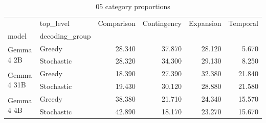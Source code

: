 \begin{table}
\caption{05 category proportions}
\begin{tabular}{llrrrr}
\toprule
 & top_level & Comparison & Contingency & Expansion & Temporal \\
model & decoding_group &  &  &  &  \\
\midrule
\multirow[t]{2}{*}{Gemma 4 2B} & Greedy & 28.340 & 37.870 & 28.120 & 5.670 \\
 & Stochastic & 28.320 & 34.300 & 29.130 & 8.250 \\
\cline{1-6}
\multirow[t]{2}{*}{Gemma 4 31B} & Greedy & 18.390 & 27.390 & 32.380 & 21.840 \\
 & Stochastic & 19.430 & 30.120 & 28.880 & 21.580 \\
\cline{1-6}
\multirow[t]{2}{*}{Gemma 4 4B} & Greedy & 38.380 & 21.710 & 24.340 & 15.570 \\
 & Stochastic & 42.890 & 18.170 & 23.270 & 15.670 \\
\cline{1-6}
\bottomrule
\end{tabular}
\end{table}
